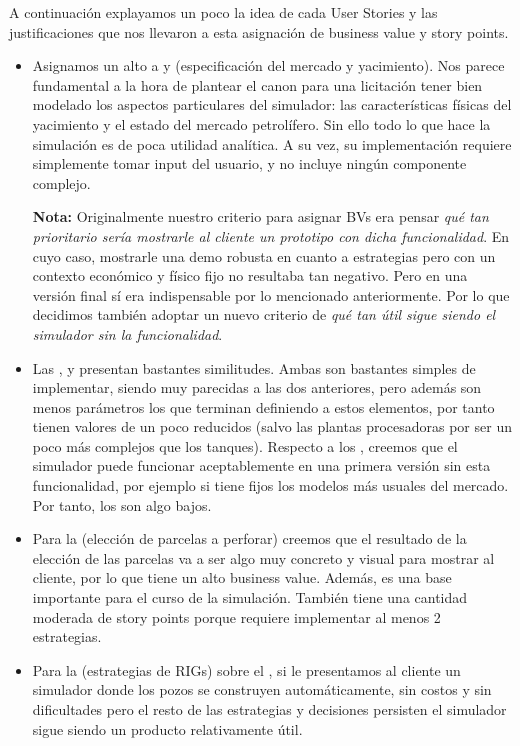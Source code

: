 A continuación explayamos un poco la idea de cada User Stories y las justificaciones que nos llevaron a esta asignación de business value y story points.

\begin{itemize}
  \item Asignamos un alto \BV{} a  y  (especificación del mercado y yacimiento). Nos parece fundamental a la hora de plantear el canon para una licitación tener bien modelado los aspectos particulares del simulador: las características físicas del yacimiento y el estado del mercado petrolífero. Sin ello todo lo que hace la simulación es de poca utilidad analítica. A su vez, su implementación requiere simplemente tomar input del usuario, y no incluye ningún componente complejo.

  \textbf{Nota:} Originalmente nuestro criterio para asignar BVs era pensar \emph{qué tan prioritario sería mostrarle al cliente un prototipo con dicha funcionalidad}. En cuyo caso, mostrarle una demo robusta en cuanto a estrategias pero con un contexto económico y físico fijo no resultaba tan negativo. Pero en una versión final sí era indispensable por lo mencionado anteriormente. Por lo que decidimos también adoptar un nuevo criterio de \emph{qué tan útil sigue siendo el simulador sin la funcionalidad}.

  \item Las ,  y  presentan bastantes similitudes. Ambas son bastantes simples de implementar, siendo muy parecidas a las dos anteriores, pero además son menos parámetros los que  terminan definiendo a estos elementos, por tanto tienen valores de \SP{} un poco reducidos (salvo  las plantas procesadoras por ser un poco más complejos que los tanques). Respecto a los \BV{}, creemos que el simulador puede funcionar aceptablemente en una primera versión sin esta funcionalidad, por ejemplo si tiene fijos los modelos más usuales del mercado. Por tanto, los \BV{} son algo bajos. 

  \item Para la  (elección de parcelas a perforar) creemos que el resultado de la elección de las parcelas va a ser algo muy concreto y visual para mostrar al cliente, por lo que tiene un alto business value. Además, es una base importante para el curso de la simulación. También tiene una cantidad moderada de story points porque requiere implementar al menos 2 estrategias.
  
  \item Para la  (estrategias de RIGs) sobre el \BV{}, si le presentamos al cliente un simulador donde los pozos se construyen automáticamente, sin costos y sin dificultades pero el resto de las estrategias y decisiones persisten el simulador sigue siendo un producto relativamente útil. 


\end{itemize}
